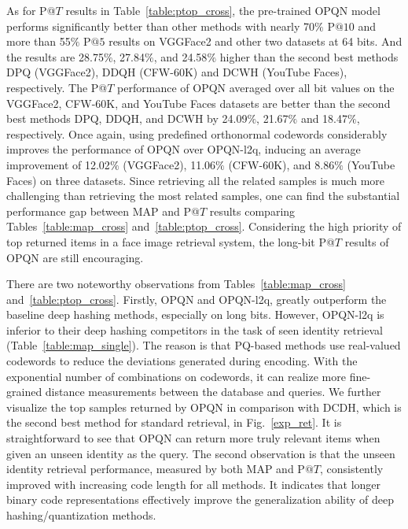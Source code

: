 \documentclass{elsarticle}
\begin{document}
As for P@$T$ results in Table~\ref{table:ptop_cross}, the pre-trained OPQN model performs significantly better than other methods with nearly 70$\%$ P$@10$ and more than 55$\%$ P$@5$ results on VGGFace2 and other two datasets at 64 bits. And the results are 28.75$\%$, 27.84$\%$, and 24.58$\%$ higher than the second best methods DPQ (VGGFace2), DDQH (CFW-60K) and DCWH (YouTube Faces), respectively. The P@$T$ performance of OPQN averaged over all bit values on the VGGFace2, CFW-60K, and YouTube Faces datasets are better than the second best methods DPQ, DDQH, and DCWH by 24.09$\%$, 21.67$\%$ and 18.47$\%$, respectively. Once again, using predefined orthonormal codewords considerably improves the performance of OPQN over OPQN-l2q, inducing an average improvement of 12.02$\%$ (VGGFace2), 11.06$\%$ (CFW-60K), and 8.86$\%$ (YouTube Faces) on three datasets. Since retrieving all the related samples is much more challenging than retrieving the most related samples, one can find the substantial performance gap between MAP and P@$T$ results comparing Tables~\ref{table:map_cross} and~\ref{table:ptop_cross}. Considering the high priority of top returned items in a face image retrieval system, the long-bit P@$T$ results of OPQN are still encouraging. 

There are two noteworthy observations from Tables~\ref{table:map_cross} and~\ref{table:ptop_cross}. Firstly, OPQN and OPQN-l2q, greatly outperform the baseline deep hashing methods, especially on long bits. However, OPQN-l2q is inferior to their deep hashing competitors in the task of seen identity retrieval (Table~\ref{table:map_single}). The reason is that PQ-based methods use real-valued codewords to reduce the deviations generated during encoding. With the exponential number of combinations on codewords, it can realize more fine-grained distance measurements between the database and queries. We further visualize the top samples returned by OPQN in comparison with DCDH, which is the second best method for standard retrieval, in Fig.~\ref{exp_ret}. It is straightforward to see that OPQN can return more truly relevant items when given an unseen identity as the query. The second observation is that the unseen identity retrieval performance, measured by both MAP and P$@T$, consistently improved with increasing code length for all methods. It indicates that longer binary code representations effectively improve the generalization ability of deep hashing/quantization methods. %
\end{document}
